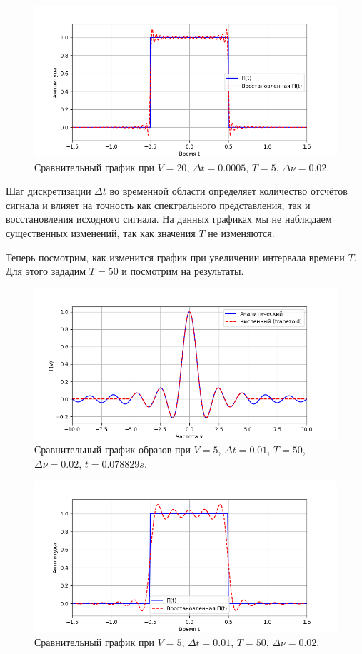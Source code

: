 \documentclass[a4paper]{article}
\begin{document}
\begin{figure}[H]
  \centering
  \includegraphics[width=\textwidth]{src/task_1_1/time_5_0.0005_20_0.02.png}
  \caption{Сравнительный график при $V=20$, $\Delta t=0.0005$, $T=5$, $\Delta \nu=0.02$.} 
\end{figure}
\noindent Шаг дискретизации $\Delta t$ во временной области определяет количество отсчётов сигнала и влияет на точность как спектрального представления, так и восстановления исходного сигнала. На данных графиках мы не наблюдаем существенных изменений, так как значения $T$ не изменяются. 

Теперь посмотрим, как изменится график при увеличении интервала времени $T$. Для этого зададим $T=50$ и посмотрим на результаты.

\begin{figure}[H]
  \centering
  \includegraphics[width=\textwidth]{src/task_1_1/freq_50_0.01_5_0.02.png}
  \caption{Сравнительный график образов при $V=5$, $\Delta t=0.01$, $T=50$, $\Delta \nu=0.02$, $t=0.078829 s$.} 
\end{figure}
\begin{figure}[H]
  \centering
  \includegraphics[width=\textwidth]{src/task_1_1/time_50_0.01_5_0.02.png}
  \caption{Сравнительный график при $V=5$, $\Delta t=0.01$, $T=50$, $\Delta \nu=0.02$.} 
\end{figure}
\end{document}
